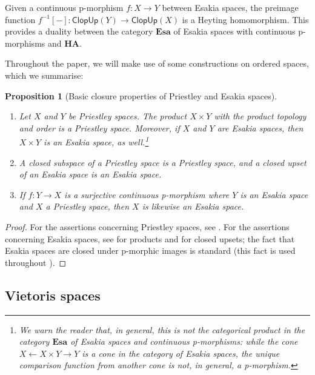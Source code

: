 \documentclass[12pt]{amsart}
\theoremstyle{plain}
\newtheorem{proposition}[theorem]{Proposition}
\theoremstyle{definition}
\newcommand{\cat}[1]{\mathbf{#1}}
\newcommand{\HA}{\cat{HA}}
\newcommand{\Esa}{\cat{Esa}}
\newcommand{\ClopUp}{\mathsf{ClopUp}}
\begin{document}
Given a continuous p-morphism $f\colon X\to Y$ between Esakia spaces, the preimage function $f^{-1}[-] \colon \ClopUp(Y)\to \ClopUp(X)$ is a Heyting homomorphism. 
This provides a duality between the category $\Esa$ of Esakia spaces with continuous p-morphisms and $\HA$.

Throughout the paper, we will make use of some constructions on ordered spaces, which we summarise:

\begin{proposition}[Basic closure properties of Priestley and Esakia spaces] \label{properties.pri}\hfill
    \begin{enumerate}
        \item\label{properties.pri1}
        Let $X$ and $Y$ be Priestley spaces. The product $X\times Y$ with the product topology and order is a Priestley space. Moreover, if $X$ and $Y$ are Esakia spaces, then $X\times Y$ is an Esakia space, as well.\footnote{We warn the reader that, in general, this is \emph{not} the categorical product in the category $\Esa$ of Esakia spaces and continuous p-morphisms: while the cone $X \leftarrow X \times Y \rightarrow Y$ is a cone in the category of Esakia spaces, the unique comparison function from another cone is not, in general, a p-morphism.} 
        
        \item\label{properties.pri2} A closed subspace of a Priestley space is a Priestley space, and a closed upset of an Esakia space is an Esakia space.

        \item \label{properties.pri3} If $f\colon Y\to X$ is a surjective continuous p-morphism where $Y$ is an Esakia space and $X$ a Priestley space, then $X$ is likewise an Esakia space.
    \end{enumerate}
\end{proposition}

\begin{proof}
    For the assertions concerning Priestley spaces, see
    \cite[Ch.~11]{Davey2002-lr}. For the assertions concerning Esakia spaces, see \cite[Sec.~A.8.1]{Esakiach2019HeyAlg} for products and \cite[Thm.~3.1.2]{Esakiach2019HeyAlg} for closed upsets; the fact that Esakia spaces are closed under p-morphic images is standard (this fact is used throughout \cite[Sec.~3.3]{Esakiach2019HeyAlg}).
\end{proof}


\subsection{Vietoris spaces}
\end{document}
